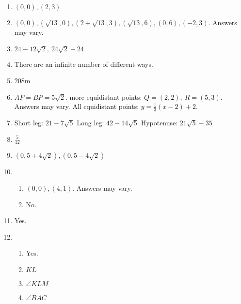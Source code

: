 \documentclass{article}
\begin{document}
\begin{enumerate}
\item $(0,0), (2, 3)$

\item $(0, 0), (\sqrt{13}, 0), (2 + \sqrt{13}, 3), (\sqrt{13}, 6), (0, 6), (-2, 3)$. Answers may vary.

\item $24 - 12\sqrt{2}, \ 24\sqrt{2} - 24$

\item There are an infinite number of different ways.

\item 208m

\item $AP = BP = 5\sqrt{2}$.  more equidistant points: $Q = (2,2), \ R = (5,3)$. Answers may vary. \newline
	All equidistant points: $y = \frac{1}{3}(x - 2) + 2.$

\item Short leg: $21 - 7\sqrt{5}$ \newline
	Long leg: $42 - 14\sqrt{5}$ \newline
	Hypotenuse: $21\sqrt{5} - 35$
	
\item $\frac{5}{12}$

\item $(0, 5 + 4\sqrt{2}), (0, 5 - 4\sqrt{2})$

\item 

	\begin{enumerate}
	
	\item $(0,0), (4, 1)$. Answers may vary.

	\item No.
	
	\end{enumerate}

\item Yes.

\item

	\begin{enumerate}
	
	\item Yes.
	
	\item $\overline{KL}$
	
	\item $\angle KLM$
	
	\item $\angle BAC$
	

\end{enumerate}
\end{enumerate}
\end{document}

